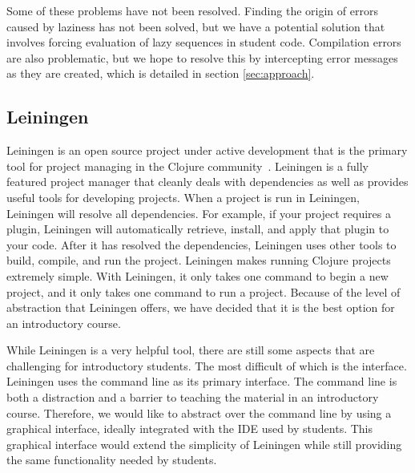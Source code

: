 \documentclass[12pt]{article}
\begin{document}
Some of these problems have not been resolved. Finding the origin of errors caused by laziness has not been solved, but we have a potential solution that involves forcing evaluation of lazy sequences in student code. Compilation errors are also problematic, but we hope to resolve this by intercepting error messages as they are created, which is detailed in section \ref{sec:approach}.


 
\subsection{Leiningen}
Leiningen is an open source project under active development that is the primary tool for project managing in the Clojure community~\cite{LeinGitHub}.
Leiningen is a fully featured project manager that cleanly deals with dependencies as well as provides useful tools for developing projects. When a project is run in Leiningen, Leiningen will resolve all dependencies. For example, if your project requires a plugin, Leiningen will automatically retrieve, install, and apply that plugin to your code. After it has resolved the dependencies, Leiningen uses other tools to build, compile, and run the project. Leiningen makes running Clojure projects extremely simple. With Leiningen, it only takes one command to begin a new project, and it only takes one command to run a project. Because of the level of abstraction that Leiningen offers, we have decided that it is the best option for an introductory course.

While Leiningen is a very helpful tool, there are still some aspects that are challenging for introductory students. The most difficult of which is the interface. Leiningen uses the command line as its primary interface. The command line is both a distraction and a barrier to teaching the material in an introductory course. Therefore, we would like to abstract over the command line by using a graphical interface, ideally integrated with the IDE used by students. This graphical interface would extend the simplicity of Leiningen while still providing the same functionality needed by students.
\end{document}
